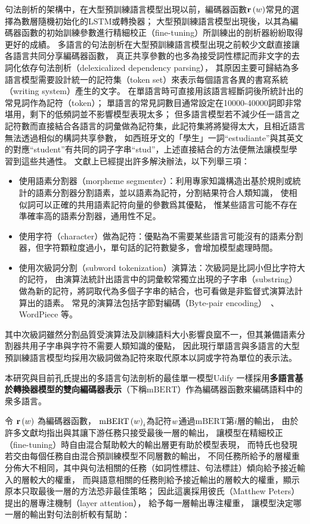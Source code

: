 句法剖析的架構中，在大型預訓練語言模型出現以前，編碼器函數$\mathbf{r}\left(w\right)$常見的選擇為數層隨機初始化的LSTM或轉換器；
大型預訓練語言模型出現後，以其為編碼器函數的初始訓練參數進行精細校正（fine-tuning）所訓練出的剖析器紛紛取得更好的成績。
多語言的句法剖析在大型預訓練語言模型出現之前較少文獻直接讓各語言共同分享編碼器函數，
真正共享參數的也多為接受詞性標記而非文字的去詞化依存句法剖析（delexicalized dependency parsing），
其原因主要可歸結為多語言模型需要設計統一的記符集（token set）來表示每個語言各異的書寫系統（writing system）產生的文字。
在單語言時可直接用該語言經斷詞後所統計出的常見詞作為記符（token）；
單語言的常見詞數目通常設定在10000-40000詞即非常堪用，剩下的低頻詞並不影響模型表現太多；
但多語言模型若不減少任一語言之記符數而直接結合各語言的詞彙做為記符集，此記符集將將變得太大，且相近語言無法透過相似的構詞共享參數，
如西班牙文的「學生」一詞``estudiante''與其英文的對應``student''有共同的詞子字串``stud''，上述直接結合的方法便無法讓模型學習到這些共通性。
文獻上已經提出許多解決辦法，以下列舉三項：
\begin{itemize}
    \item 使用語素分割器（morpheme segmenter）：利用專家知識構造出基於規則或統計的語素分割器分割語素，並以語素為記符，分割結果符合人類知識，
使相似詞可以正確的共用語素記符向量的參數爲其優點，
惟某些語言可能不存在準確率高的語素分割器，通用性不足。
    \item 使用字符（character）做為記符：優點為不需要某些語言可能沒有的語素分割器，但字符顆粒度過小，單句話的記符數變多，會增加模型處理時間。
    \item 使用次級詞分割（subword tokenization）演算法：次級詞是比詞小但比字符大的記符，
由演算法統計出語言中的詞彙較常獨立出現的子字串（substring）做為新的記符，將詞取代為多個子字串的結合，也可看做是非監督式演算法計算出的語素。
常見的演算法包括字節對編碼（Byte-pair encoding）~\cite{sennrich-etal-2016-neural}、WordPiece \cite{schuster2012japanese}等。
\end{itemize}
其中次級詞雖然分割品質受演算法及訓練語料大小影響良窳不一，但其兼備語素分割器共用子字串與字符不需要人類知識的優點，
因此現行單語言與多語言的大型預訓練語言模型均採用次級詞做為記符來取代原本以詞或字符為單位的表示法。

本研究與目前孔氏提出的多語言句法剖析的最佳單一模型Udify\cite{kondratyuk-straka-2019-75}
一樣採用\textbf{多語言基於轉換器模型的雙向編碼器表示}（下稱$\mathrm{mBERT}$）作為編碼器函數來編碼語料中的衆多語言。

令 $\mathbf{r}\left(w\right)$ 為編碼器函數，
$\mathrm{mBERT}\left(w\right)_{i}$為記符$w$通過$\mathrm{mBERT}$第$i$層的輸出，
由於許多文獻\cite{peters-etal-2018-deep,devlin-etal-2019-bert}均指出與其讓下游任務只接受最後一層的輸出，
讓模型在精細校正（fine-tuning）時自由混合幫助較大的輸出層更有助於模型表現，
而特氏也發現\cite{tenney-etal-2019-bert}若交由每個任務自由混合預訓練模型不同層數的輸出，
不同任務所給予的層權重分佈大不相同，其中與句法相關的任務（如詞性標註、句法標註）傾向給予接近輸入的層較大的權重，
而與語意相關的任務則給予接近輸出的層較大的權重，顯示原本只取最後一層的方法恐非最佳策略；
因此這裏採用彼氏（Matthew Peters）提出的層專注機制（layer attention），
給予每一層輸出專注權重，
讓模型決定哪一層的輸出對句法剖析較有幫助：

